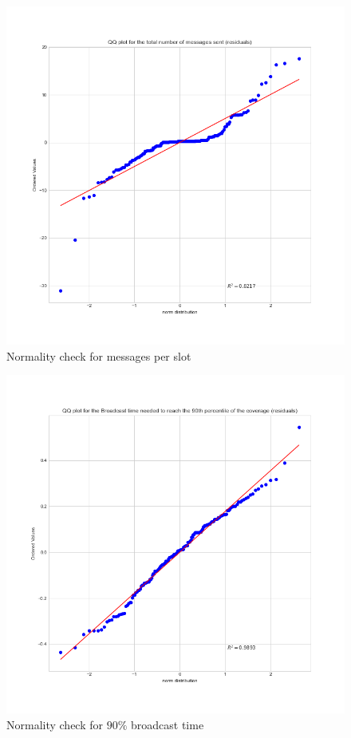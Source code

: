 \begin{figure}
	\centering
	\includegraphics[width=\textwidth]
	{img/lowdensity2kr/assumptions/msgsPerSlot-norm-fit.png}
	\caption{Normality check for messages per slot}\label{fig:system}
\end{figure}

\begin{figure}
	\centering
	\includegraphics[width=\textwidth]
	{img/lowdensity2kr/assumptions/broadcastTime90-norm-fit.png}
	\caption{Normality check for \(90\%\) broadcast time}\label{fig:system}
\end{figure}

